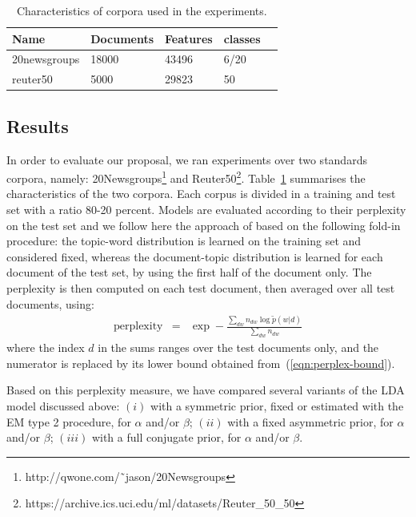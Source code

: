\begin{table}
    \begin{center}
        \begin{tabular}{ | l | l | l | l | p{5cm} |}
            \hline
            Name & Documents & Features & classes\\ \hline
            20newsgroups & 18000 & 43496 & 6/20 \\ \hline
            reuter50 & 5000 & 29823 & 50 \\ \hline
            \hline
        \end{tabular}
    \end{center}
    \caption{Characteristics of corpora used in the experiments.}
    \label{table:dataset}
\end{table}
\subsection{Results} 
In order to evaluate our proposal, we ran experiments over two standards corpora, namely: 20Newsgroups\footnote{http://qwone.com/\~\ jason/20Newsgroups} and Reuter50\footnote{https://archive.ics.uci.edu/ml/datasets/Reuter\_50\_50}.
Table~\ref{table:dataset} summarises the characteristics of the two corpora. Each corpus is divided in a training and test set with a ratio 80-20 percent. Models are evaluated according to their perplexity on the test set and we follow here the  approach of \cite{asuncion_smoothing_2009} based on the following fold-in procedure: the topic-word distribution is learned on the training set and considered fixed, whereas the document-topic distribution is learned for each document of the test set, by using the first half of the document only. The perplexity is then computed on each test document, then averaged over all test documents, using:
\begin{eqnarray*}
    \textrm{perplexity} & = & \exp-\frac{\sum_{dw}n_{dw}\log\tilde{p}(w|d)}{\sum_{dw}n_{dw}}
\end{eqnarray*}
where the index $d$ in the sums ranges over the test documents only, and the numerator is replaced by its lower bound obtained from~(\ref{eqn:perplex-bound}).

Based on this perplexity measure, we have compared several variants of the LDA model discussed above: $(i)$ with a symmetric prior, fixed or estimated with the EM type 2 procedure, for $\alpha$ and/or $\beta$; $(ii)$ with a fixed asymmetric prior, for $\alpha$ and/or $\beta$; $(iii)$ with a full conjugate prior, for $\alpha$ and/or $\beta$.

